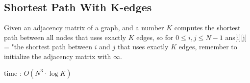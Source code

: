 \subsection{Shortest Path With K-edges}

Given an adjacency matrix of a graph, and a number $K$ computes the shortest path between all nodes that uses exactly $K$ edges, so for $0 \leq i, j \leq N-1$ ans[i][j] = "the shortest path between $i$ and $j$ that uses exactly $K$ edges, remember to initialize the adjacency matrix with $\infty$.

time : $O(N^3 \cdot \log{K})$
